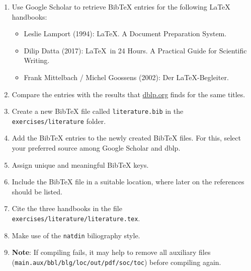 \begin{enumerate}
  \item Use Google Scholar to retrieve Bib\TeX{} entries for the following \LaTeX{}
  handbooks:
  \begin{itemize}
    \item Leslie Lamport (1994): \LaTeX. A Document Preparation System.
    \item Dilip Datta (2017): \LaTeX\ in 24 Hours. A Practical Guide for Scientific Writing.
    \item Frank Mittelbach / Michel Goossens (2002): Der \LaTeX-Begleiter.
  \end{itemize}
  \item Compare the entries with the results that \url{dblp.org} finds for the same titles.
  \item Create a new Bib\TeX{} file called \texttt{literature.bib} in the \texttt{exercises/literature} folder.
  \item Add the Bib\TeX{} entries to the newly created Bib\TeX{} files. For this, select your preferred source among Google Scholar and dblp.
  \item Assign unique and meaningful Bib\TeX{} keys.
  \item Include the Bib\TeX{} file in a suitable location, where later on the references should be listed.
  \item Cite the three handbooks in the file\\\texttt{exercises/literature/literature.tex}.
  \item Make use of the \texttt{natdin} biliography style.
  \item \textbf{Note}: If compiling fails, it may help to remove all auxiliary files \\(\texttt{main.aux/bbl/blg/loc/out/pdf/soc/toc}) before compiling again.
\end{enumerate}

